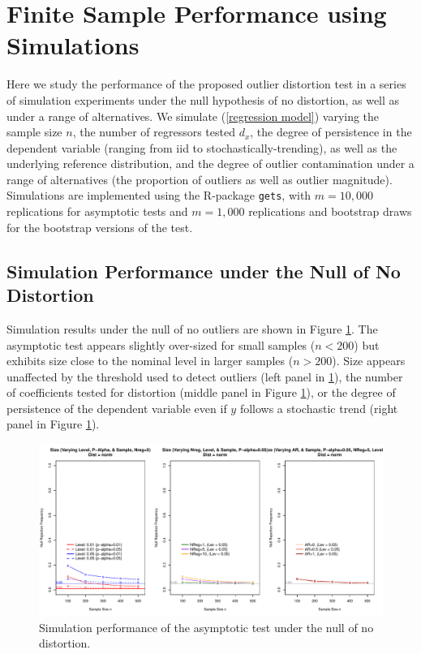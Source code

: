 \documentclass[11pt, letterpaper]{article}
\numberwithin{algorithm}{section}
\numberwithin{assumption}{section}
\numberwithin{lemma}{section}
\numberwithin{theorem}{section}
\numberwithin{corollary}{section}
\numberwithin{remark}{section}
\numberwithin{equation}{section}
\numberwithin{figure}{section}
\numberwithin{table}{section}
\begin{document}
\section{Finite Sample Performance using Simulations} \label{sec_simulations}
Here we study the performance of the proposed outlier distortion test in a series of simulation experiments under the null hypothesis of no distortion, as well as under a range of alternatives. We simulate (\ref{regression model}) varying the sample size $n$, the number of regressors tested $d_x$, the degree of persistence in the dependent variable (ranging from iid to stochastically-trending), as well as the underlying reference distribution, and the degree of outlier contamination under a range of alternatives (the proportion of outliers as well as outlier magnitude). Simulations are implemented using the R-package  \texttt{gets}, with $m=10,000$ replications for asymptotic tests and $m=1,000$ replications and bootstrap draws for the bootstrap versions of the test.

\subsection{Simulation Performance under the Null of No Distortion}


Simulation results under the null of no outliers are shown in Figure \ref{fig_out_sim_null}. The asymptotic test appears slightly over-sized for small samples ($n<200$) but exhibits size close to the nominal level in larger samples ($n>200$). Size appears unaffected by the threshold used to detect outliers (left panel in \ref{fig_out_sim_null}), the number of coefficients tested for distortion (middle panel in Figure \ref{fig_out_sim_null}), or the degree of persistence of the dependent variable even if $y$ follows a stochastic trend (right panel in Figure \ref{fig_out_sim_null}).

\begin{figure}[!htbp]  %
\centering
\includegraphics[width = \textwidth]{null_distnorm.pdf}
\caption{Simulation performance of the asymptotic test under the null of no distortion.}
\label{fig_out_sim_null}
\end{figure}
\end{document}
